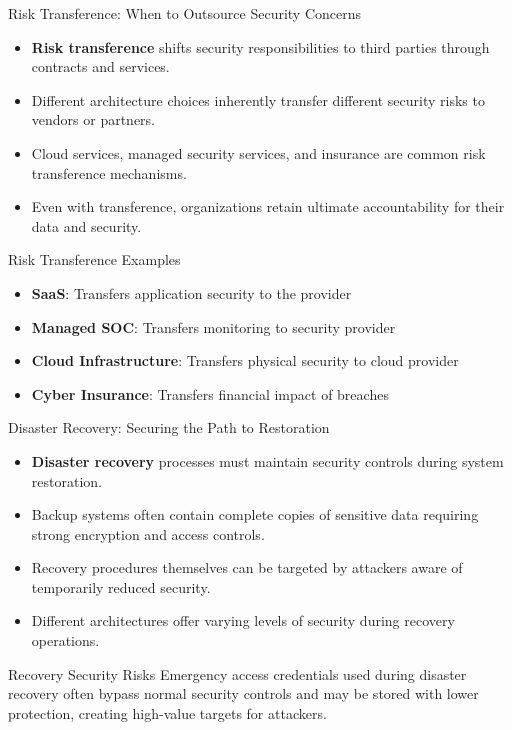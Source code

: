 \documentclass{beamer}
\begin{document}
\begin{frame}{Risk Transference: When to Outsource Security Concerns}
    \begin{itemize}
    \item \textbf{Risk transference} shifts security responsibilities to third parties through contracts and services.
    \item Different architecture choices inherently transfer different security risks to vendors or partners.
    \item Cloud services, managed security services, and insurance are common risk transference mechanisms.
    \item Even with transference, organizations retain ultimate accountability for their data and security.
    \end{itemize}
    
    \begin{exampleblock}{Risk Transference Examples}
    \begin{itemize}
    \item \textbf{SaaS}: Transfers application security to the provider
    \item \textbf{Managed SOC}: Transfers monitoring to security provider
    \item \textbf{Cloud Infrastructure}: Transfers physical security to cloud provider
    \item \textbf{Cyber Insurance}: Transfers financial impact of breaches
    \end{itemize}
    \end{exampleblock}
    \end{frame}
    
    \begin{frame}{Disaster Recovery: Securing the Path to Restoration}
    \begin{itemize}
    \item \textbf{Disaster recovery} processes must maintain security controls during system restoration.
    \item Backup systems often contain complete copies of sensitive data requiring strong encryption and access controls.
    \item Recovery procedures themselves can be targeted by attackers aware of temporarily reduced security.
    \item Different architectures offer varying levels of security during recovery operations.
    \end{itemize}
    
    \begin{alertblock}{Recovery Security Risks}
    Emergency access credentials used during disaster recovery often bypass normal security controls and may be stored with lower protection, creating high-value targets for attackers.
    \end{alertblock}
    \end{frame}
    
\end{document}
